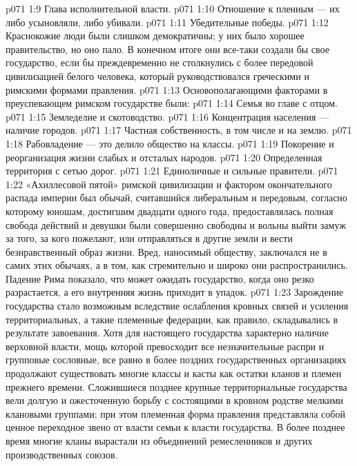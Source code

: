 \vs p071 1:9 \bibnobreakspace Глава исполнительной власти.
\vs p071 1:10 \bibnobreakspace Отношение к пленным --- их либо усыновляли, либо убивали.
\vs p071 1:11 \bibnobreakspace Убедительные победы.
\vs p071 1:12 \pc Краснокожие люди были слишком демократичны; у них было хорошее правительство, но оно пало. В конечном итоге они все\hyp{}таки создали бы свое государство, если бы преждевременно не столкнулись с более передовой цивилизацией белого человека, который руководствовался греческими и римскими формами правления.
\vs p071 1:13 \pc Основополагающими факторами в преуспевающем римском государстве были:
\vs p071 1:14 \bibnobreakspace Семья во главе с отцом.
\vs p071 1:15 \bibnobreakspace Земледелие и скотоводство.
\vs p071 1:16 \bibnobreakspace Концентрация населения --- наличие городов.
\vs p071 1:17 \bibnobreakspace Частная собственность, в том числе и на землю.
\vs p071 1:18 \bibnobreakspace Рабовладение --- это делило общество на классы.
\vs p071 1:19 \bibnobreakspace Покорение и реорганизация жизни слабых и отсталых народов.
\vs p071 1:20 \bibnobreakspace Определенная территория с сетью дорог.
\vs p071 1:21 \bibnobreakspace Единоличные и сильные правители.
\vs p071 1:22 \pc «Ахиллесовой пятой» римской цивилизации и фактором окончательного распада империи был обычай, считавшийся либеральным и передовым, согласно которому юношам, достигшим двадцати одного года, предоставлялась полная свобода действий и девушки были совершенно свободны и вольны выйти замуж за того, за кого пожелают, или отправляться в другие земли и вести безнравственный образ жизни. Вред, наносимый обществу, заключался не в самих этих обычаях, а в том, как стремительно и широко они распространились. Падение Рима показало, что может ожидать государство, когда оно резко разрастается, а его внутренняя жизнь приходит в упадок.
\vs p071 1:23 \pc Зарождение государства стало возможным вследствие ослабления кровных связей и усиления территориальных, а такие племенные федерации, как правило, складывались в результате завоевания. Хотя для настоящего государства характерно наличие верховной власти, мощь которой превосходит все незначительные распри и групповые сословные, все равно в более поздних государственных организациях продолжают существовать многие классы и касты как остатки кланов и племен прежнего времени. Сложившиеся позднее крупные территориальные государства вели долгую и ожесточенную борьбу с состоящими в кровном родстве мелкими клановыми группами; при этом племенная форма правления представляла собой ценное переходное звено от власти семьи к власти государства. В более позднее время многие кланы вырастали из объединений ремесленников и других производственных союзов.
